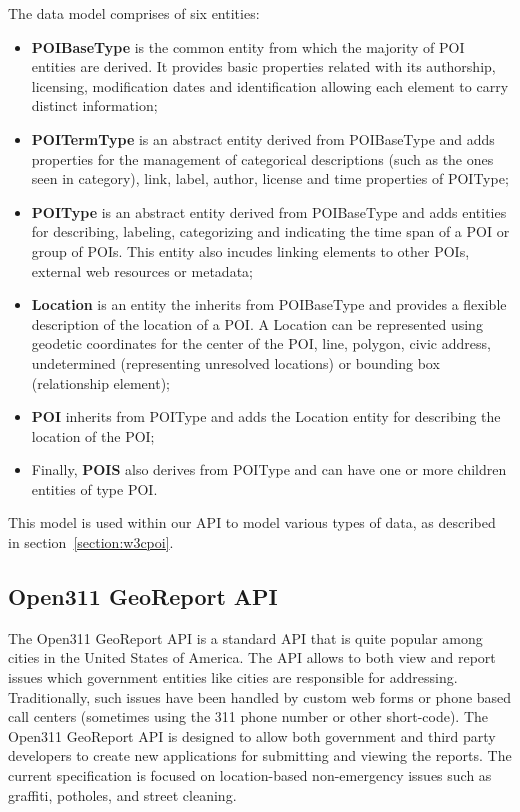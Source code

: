 \documentclass[times]{ettauth}
\begin{document}
The data model comprises of six entities:
\begin{itemize}
\item \textbf{POIBaseType} is the common entity from which the majority of POI entities are derived. It provides basic properties related with its authorship, licensing, modification dates and identification allowing each element to carry distinct information;
\item \textbf{POITermType} is an abstract entity derived from POIBaseType and adds properties for the management of categorical descriptions (such as the ones seen in category), link, label, author, license and time properties of POIType;
\item \textbf{POIType} is an abstract entity derived from POIBaseType and adds entities for describing, labeling, categorizing and indicating the time span of a POI or group of POIs. This entity also incudes linking elements to other POIs, external web resources or metadata;
\item \textbf{Location} is an entity the inherits from POIBaseType and provides a flexible description of the location of a POI. A Location can be represented using geodetic coordinates for the center of the POI, line, polygon, civic address,  undetermined (representing unresolved locations) or bounding box (relationship element);
\item \textbf{POI} inherits from POIType and adds the Location entity for describing the location of the POI;
\item Finally, \textbf{POIS} also derives from POIType and can have one or more children entities of type POI.
\end{itemize}

This model is used within our API to model various types of data, as described in section~\ref{section:w3cpoi}.

\subsection{Open311 GeoReport API}

The Open311 GeoReport API is a standard API that is quite popular among cities in the United States of America.
The API allows to both view and report issues which government entities like cities are responsible for addressing.
Traditionally, such issues have been handled by custom web forms or phone based call centers (sometimes using the 311 phone number or other short-code).
The Open311 GeoReport API is designed to allow both government and third party developers to create new applications for submitting and viewing the reports.
The current specification is focused on location-based non-emergency issues such as graffiti, potholes, and street cleaning.
\end{document}
